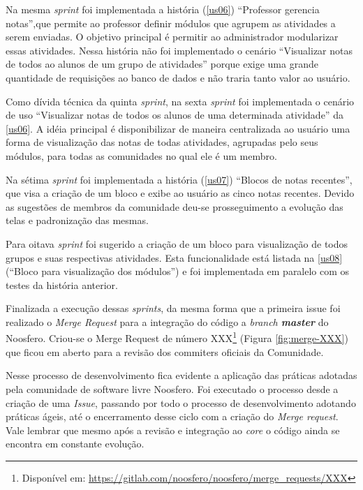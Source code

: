 Na mesma \textit{sprint} foi implementada a história (\ref{us06}) ``Professor gerencia notas'',que permite ao professor definir módulos que agrupem as atividades a serem enviadas. O objetivo principal é permitir ao administrador modularizar essas atividades. Nessa história não foi implementado o cenário ``Visualizar notas de todos ao alunos de um grupo de atividades'' porque exige uma grande quantidade de requisições ao banco de dados e não traria tanto valor ao usuário.

Como dívida técnica da quinta \textit{sprint}, na sexta \textit{sprint} foi implementada o cenário de uso ``Visualizar notas de todos os alunos de uma determinada atividade'' da \ref{us06}. A idéia principal é disponibilizar de maneira centralizada ao usuário uma forma de visualização das notas de todas atividades, agrupadas pelo seus módulos, para todas as comunidades no qual ele é um membro.

Na sétima \textit{sprint} foi implementada a história (\ref{us07}) ``Blocos de notas recentes'', que visa a criação de um bloco e exibe ao usuário as cinco notas recentes. Devido as sugestões de membros da comunidade deu-se prosseguimento a evolução das telas e padronização das mesmas.

Para oitava \textit{sprint} foi sugerido a criação de um bloco para visualização de todos grupos e suas respectivas atividades. Esta funcionalidade está listada na \ref{us08} (``Bloco para visualização dos módulos'') e foi implementada em paralelo com os testes da história anterior.

Finalizada a execução dessas \textit{sprints}, da mesma forma que a primeira issue foi realizado o \textit{Merge Request} para a integração do código a \textit{branch \textbf{master}} do Noosfero. Criou-se o Merge Request de número XXX\footnote{Disponível em: \url{https://gitlab.com/noosfero/noosfero/merge_requests/XXX}} (Figura \ref{fig:merge-XXX}) que ficou em aberto para a revisão dos commiters oficiais da Comunidade.

Nesse processo de desenvolvimento fica evidente a aplicação das práticas adotadas pela comunidade de software livre Noosfero. Foi executado o processo desde a criação de uma \textit{Issue}, passando por todo o processo de desenvolvimento adotando práticas ágeis, até o encerramento desse ciclo com a criação do \textit{Merge request}. Vale lembrar que mesmo após a revisão e integração ao \textit{core} o código ainda se encontra em constante evolução.

